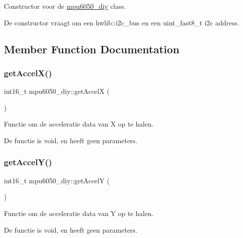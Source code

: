 Constructor voor de \hyperlink{classmpu6050__diy}{mpu6050\+\_\+diy} class. 

De constructor vraagt om een hwlib\+::i2c\+\_\+bus en een uint\+\_\+fast8\+\_\+t i2c address. 

\subsection{Member Function Documentation}
\mbox{\label{classmpu6050__diy_a5fc73907cdcf72962fda6f312e993c52}} 
\subsubsection{\texorpdfstring{get\+Accel\+X()}{getAccelX()}}
{\footnotesize\ttfamily int16\+\_\+t mpu6050\+\_\+diy\+::get\+AccelX (\begin{DoxyParamCaption}{ }\end{DoxyParamCaption})\hspace{0.3cm}{\ttfamily [inline]}}



Functie om de acceleratie data van X op te halen. 

De functie is void, en heeft geen parameters. \mbox{\label{classmpu6050__diy_a4fe4d0a613ab2f168b294524badbc441}} 
\subsubsection{\texorpdfstring{get\+Accel\+Y()}{getAccelY()}}
{\footnotesize\ttfamily int16\+\_\+t mpu6050\+\_\+diy\+::get\+AccelY (\begin{DoxyParamCaption}{ }\end{DoxyParamCaption})\hspace{0.3cm}{\ttfamily [inline]}}



Functie om de acceleratie data van Y op te halen. 

De functie is void, en heeft geen parameters. \mbox{\label{classmpu6050__diy_a077bbed10dbd5c28aec9a0126624d85f}} 
